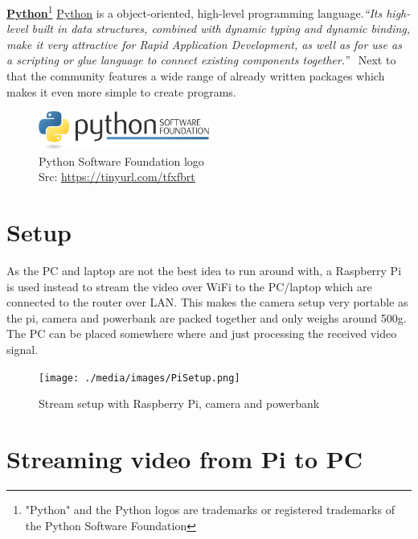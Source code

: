 \textbf{\underline{Python}}\footnote{"Python" and the Python logos are trademarks or registered trademarks of the Python Software Foundation} \newline
\href{https://www.python.org}{Python}\cite{PythonHomepage} is a object-oriented, high-level programming language.\emph{\enquote{Its high-level built in data structures, combined with dynamic typing and dynamic binding, make it very attractive for Rapid Application Development, as well as for use as a scripting or glue language to connect existing components together.}}~\cite{WhatIsPython} Next to that the community features a wide range of already written packages which makes it even more simple to create programs.\newline
\begin{figure}[h]
	\centering
	\includegraphics[width=0.5\textwidth]{./media/images/python_logo.png}
  	\caption{Python Software Foundation logo\texttrademark
  	\\Src: \url{https://tinyurl.com/tfxfbrt}}
  	\label{img:raspiconfig}
\end{figure}


\section{Setup\authorA}
As the PC and laptop are not the best idea to run around with, a Raspberry Pi is used instead to stream the video over WiFi to the PC/laptop which are connected to the router over LAN. This makes the camera setup very portable as the pi, camera and powerbank are packed together and only weighs around 500g. The PC can be placed somewhere where and just processing the received video signal.\newline
\begin{figure}[h]
	\centering
	\texttt{[image: ./media/images/PiSetup.png]}
  	\caption{Stream setup with Raspberry Pi, camera and powerbank}
  	\label{picamssetup}
\end{figure}

\section{Streaming video from Pi to PC\authorA}

